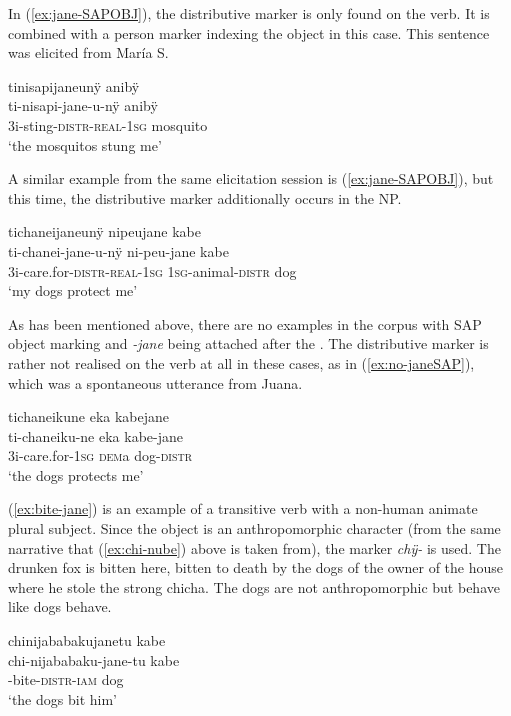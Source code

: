 In (\ref{ex:jane-SAPOBJ}), the distributive marker is only found on the verb. It is combined with a person marker indexing the object in this case. This sentence was elicited from María S.

\ea\label{ex:jane-SAPOBJ}
\begingl
\glpreamble tinisapijaneunÿ anibÿ\\
\gla ti-nisapi-jane-u-nÿ anibÿ\\
\glb 3i-sting-\textsc{distr}-\textsc{real}-1\textsc{sg} mosquito\\
\glft ‘the mosquitos stung me’
\endgl
\trailingcitation{[rxx-e181101l-1]}
\xe

A similar example from the same elicitation session is (\ref{ex:jane-SAPOBJ}), but this time, the distributive marker additionally occurs in the NP.

\ea\label{ex:jane-SAPOBJ-2}
\begingl
\glpreamble tichaneijaneunÿ nipeujane kabe\\
\gla ti-chanei-jane-u-nÿ ni-peu-jane kabe\\
\glb 3i-care.for-\textsc{distr}-\textsc{real}-1\textsc{sg} 1\textsc{sg}-animal-\textsc{distr} dog\\
\glft ‘my dogs protect me’
\endgl
\trailingcitation{[rxx-e181101l-1]}
\xe

As has been mentioned above, there are no examples in the corpus with SAP object marking and \textit{-jane} being attached after the . The distributive marker is rather not realised on the verb at all in these cases, as in (\ref{ex:no-janeSAP}), which was a spontaneous utterance from Juana.

\ea\label{ex:no-janeSAP}
\begingl
\glpreamble tichaneikune eka kabejane\\
\gla ti-chaneiku-ne eka kabe-jane\\
\glb 3i-care.for-1\textsc{sg} \textsc{dem}a dog-\textsc{distr}\\
\glft ‘the dogs protects me’
\endgl
\trailingcitation{[jxx-e150925l-1.093]}
\xe

(\ref{ex:bite-jane}) is an example of a transitive verb with a non-human animate plural subject. Since the object is an anthropomorphic character (from the same narrative that (\ref{ex:chi-nube}) above is taken from), the marker \textit{chÿ-} is used. The drunken fox is bitten here, bitten to death by the dogs of the owner of the house where he stole the strong chicha. The dogs are not anthropomorphic but behave like dogs behave.

\ea\label{ex:bite-jane}
\begingl 
\glpreamble chinijababakujanetu kabe\\
\gla chi-nijababaku-jane-tu kabe\\ 
-bite-\textsc{distr}-\textsc{iam} dog\\ 
\glft ‘the dogs bit him’
\trailingcitation{[jmx-n120429ls-x5.435]}
\xe
{}


